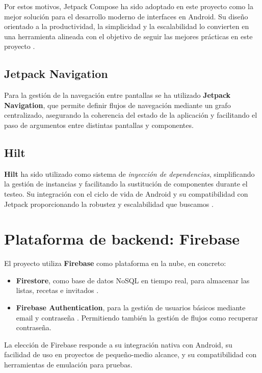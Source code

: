 Por estos motivos, Jetpack Compose ha sido adoptado en este proyecto como la mejor solución para el desarrollo moderno de interfaces en Android. Su diseño orientado a la productividad, la simplicidad y la escalabilidad lo convierten en una herramienta alineada con el objetivo de seguir las mejores prácticas en este proyecto \cite{jetpack}.


\subsection{Jetpack Navigation}

Para la gestión de la navegación entre pantallas se ha utilizado \textbf{Jetpack Navigation}, que permite definir flujos de navegación mediante un grafo centralizado, asegurando la coherencia del estado de la aplicación y facilitando el paso de argumentos entre distintas pantallas y componentes.

\subsection{Hilt}

\textbf{Hilt} ha sido utilizado como sistema de \textit{inyección de dependencias}, simplificando la gestión de instancias y facilitando la sustitución de componentes durante el testeo. Su integración con el ciclo de vida de Android y su compatibilidad con Jetpack proporcionando la robustez y escalabilidad que buscamos \cite{hilt}.

\section{Plataforma de backend: Firebase}

El proyecto utiliza \textbf{Firebase} como plataforma en la nube, en concreto:

\begin{itemize}
    \item \textbf{Firestore}, como base de datos NoSQL en tiempo real, para almacenar las listas, recetas e invitados \cite{firestore}.
    \item \textbf{Firebase Authentication}, para la gestión de usuarios básicos mediante email y contraseña \cite{firebase-auth}. Permitiendo también la gestión de flujos como recuperar contraseña.
\end{itemize}

La elección de Firebase responde a su integración nativa con Android, su facilidad de uso en proyectos de pequeño-medio alcance, y su compatibilidad con herramientas de emulación para pruebas.


